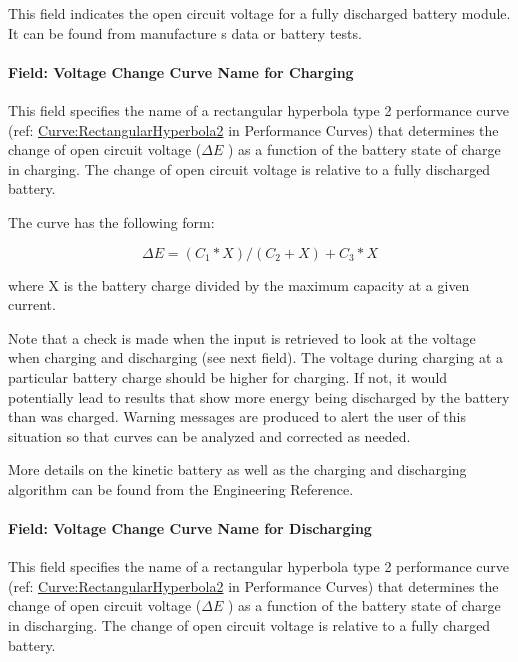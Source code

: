 This field indicates the open circuit voltage for a fully discharged battery module. It can be found from manufacture s data or battery tests.

\paragraph{Field: Voltage Change Curve Name for Charging}\label{field-voltage-change-curve-name-for-charging}

This field specifies the name of a rectangular hyperbola type 2 performance curve (ref: \hyperref[curverectangularhyperbola2]{Curve:RectangularHyperbola2} in Performance Curves) that determines the change of open circuit voltage (\(\Delta E\) ) as a function of the battery state of charge in charging. The change of open circuit voltage is relative to a fully discharged battery.

The curve has the following form:

\begin{equation}
\Delta E = ({C_1}*X)/({C_2} + X) + {C_3}*X
\end{equation}

where X is the battery charge divided by the maximum capacity at a given current.

Note that a check is made when the input is retrieved to look at the voltage when charging and discharging (see next field). The voltage during charging at a particular battery charge should be higher for charging.  If not, it would potentially lead to results that show more energy being discharged by the battery than was charged. Warning messages are produced to alert the user of this situation so that curves can be analyzed and corrected as needed.

More details on the kinetic battery as well as the charging and discharging algorithm can be found from the Engineering Reference.

\paragraph{Field: Voltage Change Curve Name for Discharging}\label{field-voltage-change-curve-name-for-discharging}

This field specifies the name of a rectangular hyperbola type 2 performance curve (ref: \hyperref[curverectangularhyperbola2]{Curve:RectangularHyperbola2} in Performance Curves) that determines the change of open circuit voltage (\(\Delta E\) ) as a function of the battery state of charge in discharging. The change of open circuit voltage is relative to a fully charged battery.

